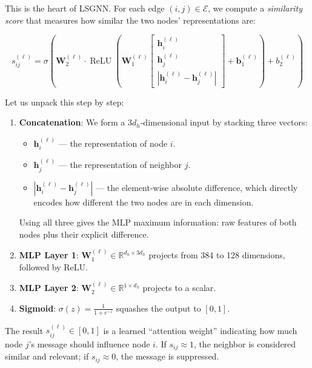 \documentclass[conference]{IEEEtran}
\newcommand{\R}{\mathbb{R}}
\newcommand{\E}{\mathcal{E}}
\newcommand{\vect}[1]{\bm{#1}}
\newcommand{\mat}[1]{\mathbf{#1}}
\DeclareMathOperator{\ReLU}{ReLU}
\begin{document}
This is the heart of LSGNN. For each edge $(i, j) \in \E$, we compute a \emph{similarity score} that measures how similar the two nodes' representations are:

\begin{equation}
    s_{ij}^{(\ell)} = \sigma\!\left(\mat{W}_2^{(\ell)} \cdot \ReLU\!\left(\mat{W}_1^{(\ell)} \begin{bmatrix} \vect{h}_i^{(\ell)} \\ \vect{h}_j^{(\ell)} \\ |\vect{h}_i^{(\ell)} - \vect{h}_j^{(\ell)}| \end{bmatrix} + \vect{b}_1^{(\ell)}\right) + b_2^{(\ell)}\right)
\end{equation}

Let us unpack this step by step:
\begin{enumerate}
    \item \textbf{Concatenation}: We form a $3d_h$-dimensional input by stacking three vectors:
    \begin{itemize}
        \item $\vect{h}_i^{(\ell)}$ --- the representation of node $i$.
        \item $\vect{h}_j^{(\ell)}$ --- the representation of neighbor $j$.
        \item $|\vect{h}_i^{(\ell)} - \vect{h}_j^{(\ell)}|$ --- the element-wise absolute difference, which directly encodes how different the two nodes are in each dimension.
    \end{itemize}
    Using all three gives the MLP maximum information: raw features of both nodes plus their explicit difference.

    \item \textbf{MLP Layer 1}: $\mat{W}_1^{(\ell)} \in \R^{d_h \times 3d_h}$ projects from 384 to 128 dimensions, followed by ReLU.

    \item \textbf{MLP Layer 2}: $\mat{W}_2^{(\ell)} \in \R^{1 \times d_h}$ projects to a scalar.

    \item \textbf{Sigmoid}: $\sigma(z) = \frac{1}{1 + e^{-z}}$ squashes the output to $[0, 1]$.
\end{enumerate}

The result $s_{ij}^{(\ell)} \in [0, 1]$ is a learned ``attention weight'' indicating how much node $j$'s message should influence node $i$. If $s_{ij} \approx 1$, the neighbor is considered similar and relevant; if $s_{ij} \approx 0$, the message is suppressed.
\end{document}
